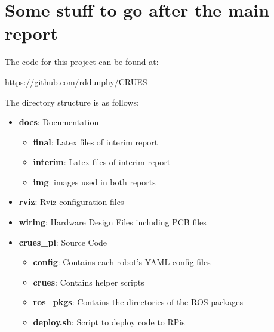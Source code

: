 
\chapter{Some stuff to go after the main report}\label{appendix/a}

The code for this project can be found at:
\begin{center}
https://github.com/rddunphy/CRUES
\end{center}

The directory structure is as follows: 

\begin{itemize}
	\item[] \textbf{docs}: Documentation
		\begin{itemize}
			\item[] \textbf{final}: Latex files of interim report
			\item[] \textbf{interim}: Latex files of interim report
			\item[] \textbf{img}: images used in both reports
		\end{itemize}
	\item[] \textbf{rviz}: Rviz configuration files
	\item[] \textbf{wiring}: Hardware Design Files including PCB files
	\item[] \textbf{crues\_pi}: Source Code
		\begin{itemize}
			\item[] \textbf{config}: Contains each robot's YAML config files
			\item[] \textbf{crues}: Contains helper scripts
			\item[] \textbf{ros\_pkgs}: Contains the directories of the ROS packages
			\item[] \textbf{deploy.sh}: Script to deploy code to RPis
		\end{itemize}
\end{itemize}
